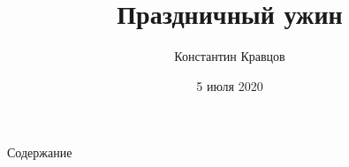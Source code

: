 \documentclass[t]{beamer}  %
\title{Праздничный ужин}
\subtitle{}
\author{Константин Кравцов}%
\date{5 июля 2020}
\begin{document}
\begin{frame}
	\maketitle
\end{frame}


\begin{frame}[c]\label{ToC}
	
	\begin{block}{\begin{center}Содержание\end{center}}
	\begin{center}
		\hyperlink{main}{} \\
		\hyperlink{cakes}{} \\
		\hyperlink{drinks}{} \\
	\end{center}
	\end{block}
	
\end{frame}


\end{document}
